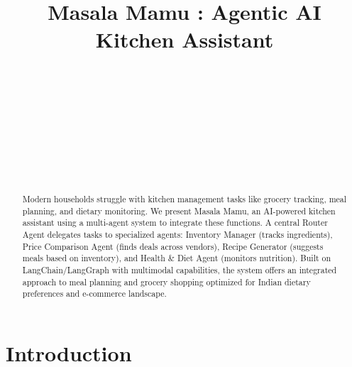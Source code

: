 \documentclass{ecai}
\begin{document}

\begin{frontmatter}




\title{Masala Mamu : Agentic AI Kitchen Assistant}

\author[A,B]{~}
\author[A,B]{~}
\author[A,B]{~}
\author[A,B]{~}
\author[A,B]{~}
\address[A]{Division of Interdisciplinary Sciences}
\address[B]{Indian Institute of Science, Bangalore}

\begin{abstract}
Modern households struggle with kitchen management tasks like grocery tracking, meal planning, and dietary monitoring. We present Masala Mamu, an AI-powered kitchen assistant using a multi-agent system to integrate these functions. A central Router Agent delegates tasks to specialized agents: Inventory Manager (tracks ingredients), Price Comparison Agent (finds deals across vendors), Recipe Generator (suggests meals based on inventory), and Health \& Diet Agent (monitors nutrition). Built on LangChain/LangGraph with multimodal capabilities, the system offers an integrated approach to meal planning and grocery shopping optimized for Indian dietary preferences and e-commerce landscape.
\end{abstract}

\end{frontmatter}

\section{Introduction}
\end{document}
